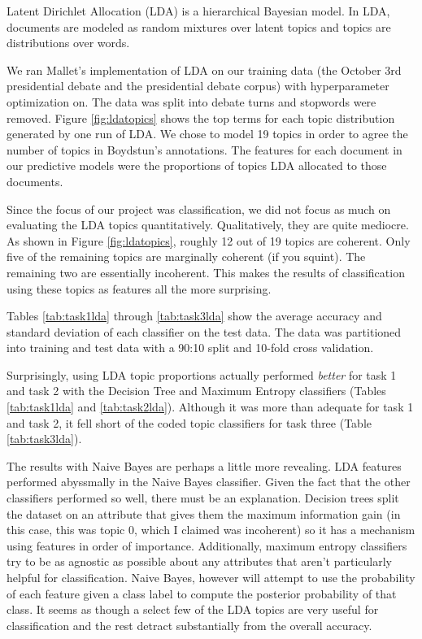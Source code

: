 
Latent Dirichlet Allocation (LDA) is a hierarchical Bayesian model.
In LDA, documents are modeled as random mixtures over latent topics and topics are distributions over words.

We ran Mallet's implementation of LDA on our training data (the October 3rd presidential debate and the presidential debate corpus) with hyperparameter optimization on.
The data was split into debate turns and stopwords were removed.
Figure \ref{fig:ldatopics} shows the top terms for each topic distribution generated by one run of LDA.
We chose to model 19 topics in order to agree the number of topics in Boydstun's annotations.
The features for each document in our predictive models were the proportions of topics LDA allocated to those documents.

Since the focus of our project was classification, we did not focus as much on evaluating the LDA topics quantitatively.
Qualitatively, they are quite mediocre.
As shown in Figure \ref{fig:ldatopics}, roughly 12 out of 19 topics are coherent.
Only five of the remaining topics are marginally coherent (if you squint).
The remaining two are essentially incoherent.
This makes the results of classification using these topics as features all the more surprising.

Tables \ref{tab:task1lda} through \ref{tab:task3lda} show the average accuracy and standard deviation of each classifier on the test data.
The data was partitioned into training and test data with a 90:10 split and 10-fold cross validation.

Surprisingly, using LDA topic proportions actually performed \textit{better} for task 1 and task 2 with the Decision Tree and Maximum Entropy classifiers (Tables \ref{tab:task1lda} and \ref{tab:task2lda}).
Although it was more than adequate for task 1 and task 2, it fell short of the coded topic classifiers for task three (Table \ref{tab:task3lda}).

The results with Naive Bayes are perhaps a little more revealing.
LDA features performed abyssmally in the Naive Bayes classifier.
Given the fact that the other classifiers performed so well, there must be an explanation.
Decision trees split the dataset on an attribute that gives them the maximum information gain (in this case, this was topic 0, which I claimed was incoherent) so it has a mechanism using features in order of importance.
Additionally, maximum entropy classifiers try to be as agnostic as possible about any attributes that aren't particularly helpful for classification.
Naive Bayes, however will attempt to use the probability of each feature given a class label to compute the posterior probability of that class.
It seems as though a select few of the LDA topics are very useful for classification and the rest detract substantially from the overall accuracy.

